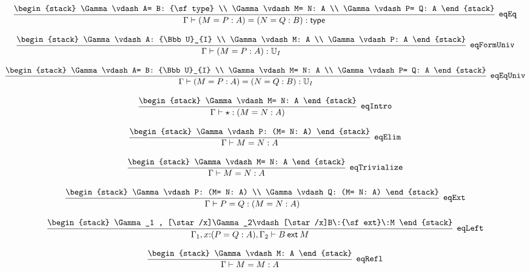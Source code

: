 \[
\infer[{\tt eqEq}]{\Gamma \vdash (M= P: A)= (N= Q: B): {\sf type}}{
\begin{stack}
\Gamma \vdash A= B: {\sf type}
\\
\Gamma \vdash M= N: A
\\
\Gamma \vdash P= Q: A
\end{stack}}
\]

\[
\infer[{\tt eqFormUniv}]{\Gamma \vdash (M= P: A): {\Bbb U}_{I}}{
\begin{stack}
\Gamma \vdash A: {\Bbb U}_{I}
\\
\Gamma \vdash M: A
\\
\Gamma \vdash P: A
\end{stack}}
\]

\[
\infer[{\tt eqEqUniv}]{\Gamma \vdash (M= P: A)= (N= Q: B): {\Bbb U}_{I}}{
\begin{stack}
\Gamma \vdash A= B: {\Bbb U}_{I}
\\
\Gamma \vdash M= N: A
\\
\Gamma \vdash P= Q: A
\end{stack}}
\]

\[
\infer[{\tt eqIntro}]{\Gamma \vdash \star : (M= N: A)}{
\begin{stack}
\Gamma \vdash M= N: A
\end{stack}}
\]

\[
\infer[{\tt eqElim}]{\Gamma \vdash M= N: A}{
\begin{stack}
\Gamma \vdash P: (M= N: A)
\end{stack}}
\]

\[
\infer[{\tt eqTrivialize}]{\Gamma \vdash M= N: A}{
\begin{stack}
\Gamma \vdash M= N: A
\end{stack}}
\]

\[
\infer[{\tt eqExt}]{\Gamma \vdash P= Q: (M= N: A)}{
\begin{stack}
\Gamma \vdash P: (M= N: A)
\\
\Gamma \vdash Q: (M= N: A)
\end{stack}}
\]

\[
\infer[{\tt eqLeft}]{\Gamma_1 ,x\mathord{:}(P= Q: A), \Gamma_2 \vdash B\:{\sf ext}\:M}{
\begin{stack}
\Gamma_1 , [\star /x]\Gamma_2\vdash [\star /x]B\:{\sf ext}\:M
\end{stack}}
\]

\[
\infer[{\tt eqRefl}]{\Gamma \vdash M= M: A}{
\begin{stack}
\Gamma \vdash M: A
\end{stack}}
\]

